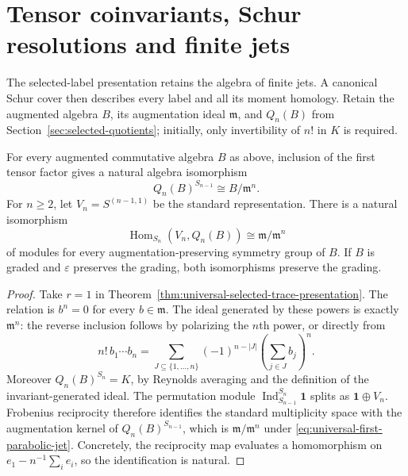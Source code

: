 \section{Tensor coinvariants, Schur resolutions and finite jets}
\label{sec:tensor-applications}

The selected-label presentation retains the algebra of finite jets.
A canonical Schur cover then describes every label and all its moment
homology. Retain the augmented
algebra $B$, its augmentation ideal $\mathfrak m$, and $Q_n(B)$ from
Section~\ref{sec:selected-quotients}; initially, only invertibility of
$n!$ in $K$ is required.

\begin{theorem}
\label{thm:universal-first-parabolic-jet}
For every augmented commutative algebra $B$ as above, inclusion of
the first tensor factor gives a natural algebra isomorphism
\begin{equation}\label{eq:universal-first-parabolic-jet}
                  Q_n(B)^{S_{n-1}}\cong B/\mathfrak m^n.
\end{equation}
For $n\ge2$, let $V_n=S^{(n-1,1)}$ be the standard representation.
There is a natural isomorphism
\begin{equation}\label{eq:universal-standard-jet}
 \operatorname{Hom}_{S_n}(V_n,Q_n(B))
       \cong \mathfrak m/\mathfrak m^n
\end{equation}
of modules for every augmentation-preserving symmetry group of $B$.
If $B$ is graded and $\varepsilon$ preserves the grading, both
isomorphisms preserve the grading.
\end{theorem}

\begin{proof}
Take $r=1$ in Theorem~\ref{thm:universal-selected-trace-presentation}.
The relation is $b^n=0$ for every $b\in\mathfrak m$.
The ideal generated by these powers is exactly $\mathfrak m^n$:
the reverse inclusion follows by polarizing the $n$th power, or
directly from
\[
 n!\,b_1\cdots b_n
  =\sum_{J\subseteq\{1,\ldots,n\}}(-1)^{n-|J|}
       \left(\sum_{j\in J}b_j\right)^n.
\]
Moreover $Q_n(B)^{S_n}=K$, by Reynolds averaging and the definition
of the invariant-generated ideal.  The permutation module
$\operatorname{Ind}_{S_{n-1}}^{S_n}\mathbf1$ splits as
$\mathbf1\oplus V_n$.  Frobenius reciprocity therefore identifies
the standard multiplicity space with the augmentation kernel of
$Q_n(B)^{S_{n-1}}$, which is $\mathfrak m/\mathfrak m^n$ under
\eqref{eq:universal-first-parabolic-jet}.
Concretely, the reciprocity map evaluates a homomorphism on
$e_1-n^{-1}\sum_i e_i$, so the identification is natural.
\end{proof}

